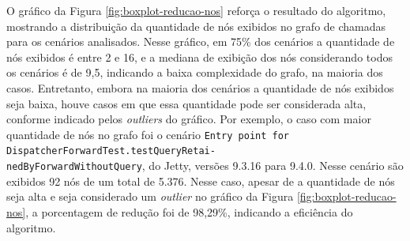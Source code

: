 O gráfico da Figura \ref{fig:boxplot-reducao-nos} reforça o resultado do algoritmo, mostrando a distribuição da quantidade de nós exibidos no grafo de chamadas para os cenários analisados. Nesse gráfico, em 75\% dos cenários a quantidade de nós exibidos é entre 2 e 16, e a mediana de exibição dos nós considerando todos os cenários é de 9,5, indicando a baixa complexidade do grafo, na maioria dos casos. Entretanto, embora na maioria dos cenários a quantidade de nós exibidos seja baixa, houve casos em que essa quantidade pode ser considerada alta, conforme indicado pelos \textit{outliers} do gráfico. Por exemplo, o caso com maior quantidade de nós no grafo foi o cenário \texttt{Entry point for DispatcherForwardTest.testQueryRetai-\\nedByForwardWithoutQuery}, do Jetty, versões 9.3.16 para 9.4.0. Nesse cenário são exibidos 92 nós de um total de 5.376. Nesse caso, apesar de a quantidade de nós seja alta e seja considerado um \textit{outlier} no gráfico da Figura \ref{fig:boxplot-reducao-nos}, a porcentagem de redução foi de 98,29\%, indicando a eficiência do algoritmo.

